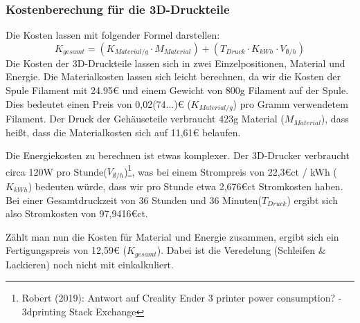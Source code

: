 \subsubsection{Kostenberechung für die 3D-Druckteile}\label{ku_kosten_druck}
\noindent Die Kosten lassen mit folgender Formel darstellen:\\
\[
K_{gesamt} =  (K_{Material/g} \cdot M_{Material}) +  (T_{Druck} \cdot  K_{kWh} \cdot V_{\emptyset/h})
\]
Die Kosten der 3D-Druckteile lassen sich in zwei Einzelpositionen, Material und Energie.
Die Materialkosten lassen sich leicht berechnen, da wir die Kosten der Spule Filament mit 24.95\euro{} und einem Gewicht von 800g Filament auf der Spule.
Dies bedeutet einen Preis von 0,02(74...)\euro{} ($K_{Material/g}$) pro Gramm verwendetem Filament.
Der Druck der Gehäuseteile verbraucht 423g Material ($M_{Material}$), dass heißt, dass die Materialkosten sich auf 11,61\euro{} belaufen.\par
\noindent Die Energiekosten zu berechnen ist etwas komplexer.
Der 3D-Drucker verbraucht circa 120W pro Stunde($V_{\emptyset/h}$)\footnote{Robert (2019): Antwort auf Creality Ender 3 printer power consumption? - 3dprinting Stack Exchange}, was bei einem Strompreis von 22,3\euro{}ct / kWh ($K_{kWh}$) bedeuten würde, dass wir pro Stunde etwa 2,676\euro{}ct Stromkosten haben. 
Bei einer Gesamtdruckzeit von 36 Stunden und 36 Minuten($T_{Druck}$) ergibt sich also Stromkosten von 97,9416\euro{}ct.\par
\noindent Zählt man nun die Kosten für Material und Energie zusammen, ergibt sich ein Fertigungspreis von 12,59\euro{} ($K_{gesamt}$). 
Dabei ist die Veredelung (Schleifen \& Lackieren) noch nicht mit einkalkuliert.\par
